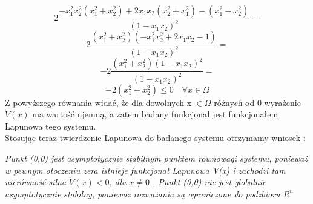 \documentclass[a4paper,11pt]{article}
\begin{document}
\begin{equation*}
2\frac{ -x_{1}^{2}x_{2}^{2}(x_{1}^{2}+x_{2}^{2})  +  2x_{1}x_{2}(x_{2}^{2}+x_{1}^{2}) - (x_{1}^{2}+x_{2}^{2})}{(1-x_{1}x_{2})^{2}}=
\end{equation*}
\begin{equation*}
2\frac{(x_{1}^{2}+x_{2}^{2}) (-x_{1}^{2}x_{2}^{2}  +  2x_{1}x_{2} - 1 )}{(1-x_{1}x_{2})^{2}}=
\end{equation*}
\begin{equation*}
-2\frac{(x_{1}^{2}+x_{2}^{2})(1-x_{1}x_{2})^{2}}{(1-x_{1}x_{2})^{2}}=
\end{equation*}
\begin{equation*}
-2(x_{1}^{2}+x_{2}^{2}) \leq 0 \quad \forall x \in \Omega
\end{equation*}
Z powyższego równania widać, że dla dowolnych x \( \in \Omega \) różnych od 0 wyrażenie \(\dot{V}(x)\) ma wartość ujemną, a zatem badany funkcjonał jest funkcjonałem Lapunowa tego systemu.\\ 
Stosując teraz twierdzenie Lapunowa do badanego systemu otrzymamy wniosek : 
\begin{center}
\textit{Punkt (0,0) jest asymptotycznie stabilnym punktem równowagi systemu, ponieważ w pewnym otoczeniu zera istnieje funkcjonał Lapunowa V(x) i zachodzi tam nierówność silna \( \dot{V}(x)<0\), dla \( x \neq 0 \) . Punkt (0,0) nie jest globalnie asymptotycznie stabilny, ponieważ rozważania są ograniczone do podzbioru \( R^{n} \)} 
\end{center}
\end{document}
